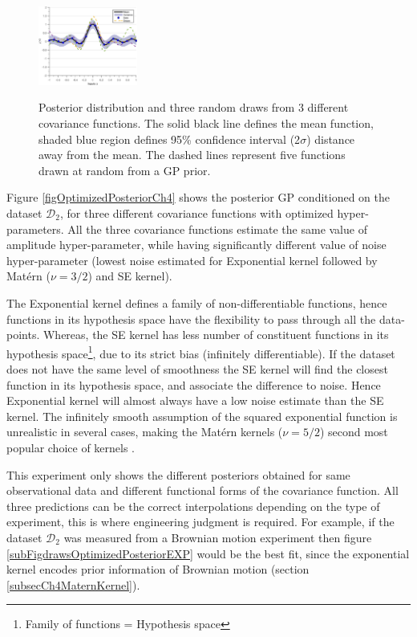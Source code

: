 \begin{figure}[!ht]
  {
        \includegraphics[width=0.29\textwidth]
        {images/part2/drawsPosteriorSE}
        \label{subFigdrawsPosteriorSE}
  }\quad
\caption{Posterior distribution and three random draws from 3 different covariance functions. The solid black line defines the mean function, shaded blue region defines 95\% confidence interval (2$\sigma$) distance away from the mean. The dashed lines represent five functions drawn at random from a GP prior. }
       \label{figpreOptimizedPosteriorCh5}
\end{figure}

\begin{mdframed}[hidealllines=true,backgroundcolor=lightgray!20]
Figure \ref{figOptimizedPosteriorCh4} shows the posterior GP conditioned on the dataset $\mathcal{D}_{2}$, for three different covariance functions with optimized hyper-parameters. All the three covariance functions estimate the same value of amplitude hyper-parameter, while having significantly different value of noise hyper-parameter (lowest noise estimated for Exponential kernel followed by Mat\'ern ($\nu=3/2$) and SE kernel). 

The Exponential kernel defines a family of non-differentiable functions, hence functions in its hypothesis space have the flexibility to pass through all the data-points. Whereas, the SE kernel has less number of constituent functions in its hypothesis space\footnote{Family of functions = Hypothesis space}, due to its strict bias (infinitely differentiable). If the dataset does not have the same level of smoothness the SE kernel will find the closest function in its hypothesis space, and associate the difference to noise. Hence Exponential kernel will almost always have a low noise estimate than the SE kernel. The infinitely smooth assumption of the squared exponential function is unrealistic in several cases, making the Mat\'ern kernels ($\nu=5/2$) second most popular choice of kernels \cite{stein2012interpolation, cornford2002modelling}. 

This experiment only shows the different posteriors obtained for same observational data and different functional forms of the covariance function. All three predictions can be the correct interpolations depending on the type of experiment, this is where engineering judgment is required. For example, if the dataset $\mathcal{D}_{2}$ was measured from a Brownian motion experiment then figure \ref{subFigdrawsOptimizedPosteriorEXP} would be the best fit, since the exponential kernel encodes prior information of Brownian motion (section \ref{subsecCh4MaternKernel}).

\end{mdframed}

